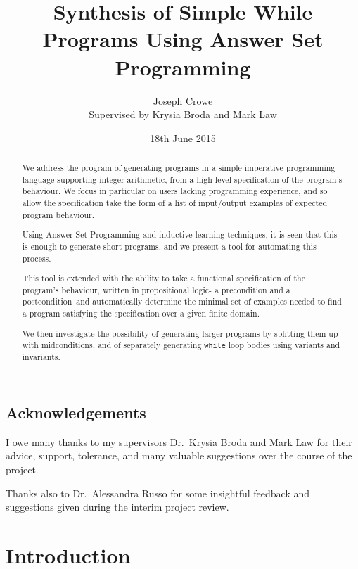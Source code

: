 \documentclass[a4paper,twoside,notitlepage]{report}
\begin{document}
\title{Synthesis of Simple While Programs Using Answer Set Programming}
\author{Joseph Crowe \\ Supervised by Krysia Broda and Mark Law}
\date{18th June 2015}
\maketitle
\clearpage

\begin{abstract}
We address the program of generating programs in a simple imperative programming
language supporting integer arithmetic, from a high-level specification of the 
program's behaviour. We focus in particular on users lacking programming experience, 
and so allow the specification take the form of a list of input/output examples of 
expected program behaviour.

Using Answer Set Programming and inductive learning techniques, it is seen that this is 
enough to generate short programs, and we present a tool for automating this process.

This tool is extended with the ability to take a functional specification of the 
program's behaviour, written in propositional logic- a precondition and a 
postcondition--and automatically determine the minimal set of examples needed to find a 
program satisfying the specification over a given finite domain.

We then investigate the possibility of generating larger programs by splitting them up 
with midconditions, and of separately generating \verb|while| loop bodies using 
variants and invariants.
\end{abstract}
\clearpage

\section*{Acknowledgements}
I owe many thanks to my supervisors Dr.\ Krysia Broda and Mark Law for their 
advice, support, tolerance, and many valuable suggestions over the course of 
the project.

Thanks also to Dr.\ Alessandra Russo for some insightful feedback and 
suggestions given during the interim project review.
\clearpage

\tableofcontents

\chapter{Introduction} \label{chp:intro}
\end{document}
